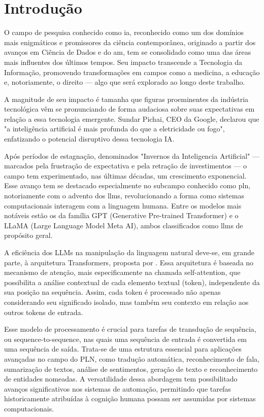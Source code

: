 \chapter{Introdução}

O campo de pesquisa conhecido como \gls{ia}, reconhecido como um dos domínios mais enigmáticos e promissores da ciência contemporânea, originado a partir dos avanços em Ciência de Dados e do \gls{am}, tem se consolidado como uma das áreas mais influentes dos últimos tempos. Seu impacto transcende a Tecnologia da Informação, promovendo transformações em campos como a medicina, a educação e, notoriamente, o direito --- algo que será explorado ao longo deste trabalho.

A magnitude de seu impacto é tamanha que figuras proeminentes da indústria tecnológica vêm se pronunciando de forma audaciosa sobre suas expectativas em relação a essa tecnologia emergente. Sundar Pichai, CEO da Google, declarou que "a inteligência artificial é mais profunda do que a eletricidade ou fogo", enfatizando o potencial disruptivo dessa tecnologia IA.

Após períodos de estagnação, denominados "Invernos da Inteligencia Artificial" \cite{russell_artificial_2016} --- marcados pela frustração de expectativa e pela retração de investimentos --- o campo tem experimentado, nas últimas décadas, um crescimento exponencial. Esse avanço tem se destacado especialmente no subcampo conhecido como \gls{pln}, notoriamente com o advento dos \gls{llm}s, revolucionando a forma como sistemas computacionais interagem com a linguagem humana. Entre os modelos mais notáveis estão os da família GPT (Generative Pre-trained Transformer) e o LLaMA (Large Language Model Meta AI), ambos classificados como \gls{llm}s de propósito geral.

A eficiência dos LLMs na manipulação da linguagem natural deve-se, em grande parte, à arquitetura Transformers, proposta por . Essa arquitetura é baseada no mecanismo de atenção, mais especificamente na chamada self-attention, que possibilita a análise contextual de cada elemento textual (token), independente da sua posição na sequência. Assim, cada token é processado não apenas considerando seu significado isolado, mas também seu contexto em relação aos outros tokens de entrada.  

Esse modelo de processamento é crucial para tarefas de transdução de sequência, ou sequence-to-sequence, nas quais uma sequência de entrada é convertida em uma sequência de saída. Trata-se de uma estrutura essencial para aplicações avançadas no campo do PLN, como tradução automática, reconhecimento de fala, sumarização de textos, análise de sentimentos, geração de texto e reconhecimento de entidades nomeadas. A versatilidade dessa abordagem tem possibilitado avanços significativos nos sistemas de automação, permitindo que tarefas historicamente atribuídas à cognição humana possam ser assumidas por sistemas computacionais.

